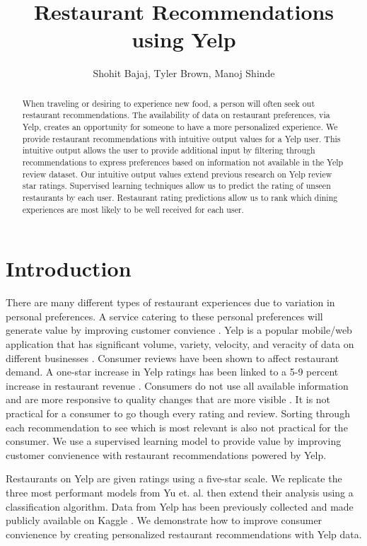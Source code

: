 \documentclass[12pt]{article}
\title{Restaurant Recommendations using Yelp}
\author{Shohit Bajaj, Tyler Brown, Manoj Shinde}
\date{ }
\begin{document}
\maketitle


\begin{abstract}
  When traveling or desiring to experience new food, a person will often seek out restaurant
  recommendations. The availability of data on restaurant preferences, via Yelp, creates an
  opportunity for someone to have a more personalized experience. We provide restaurant
  recommendations with intuitive output values for a Yelp user. This intuitive output allows
  the user to provide additional input by filtering through recommendations to express
  preferences based on information not available in the Yelp review dataset. Our intuitive output
  values extend previous research on Yelp review star ratings. Supervised learning techniques
  allow us to predict the rating of unseen
  restaurants by each user. Restaurant rating predictions allow us to rank which dining
  experiences are most likely to be well received for each user.
  \end{abstract}

\section{Introduction}

There are many different types of restaurant experiences due to variation in
personal preferences. A service catering to these personal preferences will
generate value by improving customer convience
\cite{mackay_vandevijvere_xie_lee_swinburn_2017}. Yelp is a popular mobile/web
application that has significant volume, variety, velocity, and veracity of data on different
businesses \cite{Restaura71:online}. Consumer reviews have been shown to affect restaurant
demand. A one-star increase in Yelp ratings has been linked to a 5-9 percent increase in
restaurant revenue \cite{luca2016reviews}. Consumers do not use all available information and are
more responsive to quality changes that are more visible \cite{luca2016reviews}. It is
not practical for a consumer to go though every rating and review. Sorting through
each recommendation to see which is most relevant is also not practical for the
consumer. We use a supervised learning model to provide value by improving customer
convienence with restaurant recommendations powered by Yelp.

Restaurants on Yelp are given ratings using a five-star scale. We replicate 
the three most performant models from Yu et. al. \cite{yu2015restaurants} then
extend their analysis using a classification algorithm. Data from Yelp has been previously
collected and made publicly available on Kaggle \cite{YelpData59:online}. We demonstrate
how to improve consumer convienence by creating personalized restaurant recommendations with
Yelp data.
\end{document}
